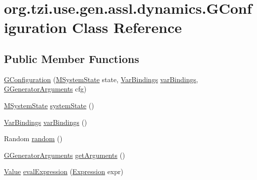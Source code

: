 \hypertarget{classorg_1_1tzi_1_1use_1_1gen_1_1assl_1_1dynamics_1_1_g_configuration}{\section{org.\-tzi.\-use.\-gen.\-assl.\-dynamics.\-G\-Configuration Class Reference}
\label{classorg_1_1tzi_1_1use_1_1gen_1_1assl_1_1dynamics_1_1_g_configuration}
}
\subsection*{Public Member Functions}
\begin{DoxyCompactItemize}
\item 
\hyperlink{classorg_1_1tzi_1_1use_1_1gen_1_1assl_1_1dynamics_1_1_g_configuration_a8814d6bdb0dc999107e7aab820f8f4ca}{G\-Configuration} (\hyperlink{classorg_1_1tzi_1_1use_1_1uml_1_1sys_1_1_m_system_state}{M\-System\-State} state, \hyperlink{classorg_1_1tzi_1_1use_1_1uml_1_1ocl_1_1value_1_1_var_bindings}{Var\-Bindings} \hyperlink{classorg_1_1tzi_1_1use_1_1gen_1_1assl_1_1dynamics_1_1_g_configuration_a8fffadd04db210d90f311a41b406d61b}{var\-Bindings}, \hyperlink{classorg_1_1tzi_1_1use_1_1gen_1_1tool_1_1_g_generator_arguments}{G\-Generator\-Arguments} cfg)
\item 
\hyperlink{classorg_1_1tzi_1_1use_1_1uml_1_1sys_1_1_m_system_state}{M\-System\-State} \hyperlink{classorg_1_1tzi_1_1use_1_1gen_1_1assl_1_1dynamics_1_1_g_configuration_a92497dae6a7c4d428db70dc81a7051bd}{system\-State} ()
\item 
\hyperlink{classorg_1_1tzi_1_1use_1_1uml_1_1ocl_1_1value_1_1_var_bindings}{Var\-Bindings} \hyperlink{classorg_1_1tzi_1_1use_1_1gen_1_1assl_1_1dynamics_1_1_g_configuration_a8fffadd04db210d90f311a41b406d61b}{var\-Bindings} ()
\item 
Random \hyperlink{classorg_1_1tzi_1_1use_1_1gen_1_1assl_1_1dynamics_1_1_g_configuration_a37034fb669583f79c0f3f657b39f25bf}{random} ()
\item 
\hyperlink{classorg_1_1tzi_1_1use_1_1gen_1_1tool_1_1_g_generator_arguments}{G\-Generator\-Arguments} \hyperlink{classorg_1_1tzi_1_1use_1_1gen_1_1assl_1_1dynamics_1_1_g_configuration_a3f8517733fe8282a2c29ffe027434eca}{get\-Arguments} ()
\item 
\hyperlink{classorg_1_1tzi_1_1use_1_1uml_1_1ocl_1_1value_1_1_value}{Value} \hyperlink{classorg_1_1tzi_1_1use_1_1gen_1_1assl_1_1dynamics_1_1_g_configuration_a68af6d87fe8f6c2399da9c11c2bf4b80}{eval\-Expression} (\hyperlink{classorg_1_1tzi_1_1use_1_1uml_1_1ocl_1_1expr_1_1_expression}{Expression} expr)
\end{DoxyCompactItemize}


